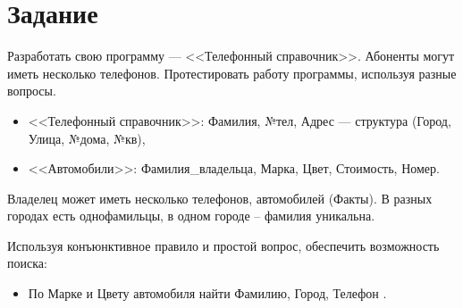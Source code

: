 \section*{Задание}

Разработать свою программу --- <<Телефонный справочник>>. Абоненты могут иметь
несколько телефонов. Протестировать работу программы, используя разные вопросы.

\begin{itemize}
    \item <<Телефонный справочник>>: Фамилия, №тел, Адрес --- структура
          (Город, Улица, №дома, №кв),
    \item <<Автомобили>>: Фамилия\_владельца, Марка, Цвет, Стоимость, Номер.
\end{itemize}

Владелец может иметь несколько телефонов, автомобилей (Факты). В разных городах
есть однофамильцы, в одном городе – фамилия уникальна.

Используя конъюнктивное правило и простой вопрос, обеспечить возможность
поиска:
\begin{itemize}
    \item По Марке и Цвету автомобиля найти Фамилию, Город, Телефон .
\end{itemize}




